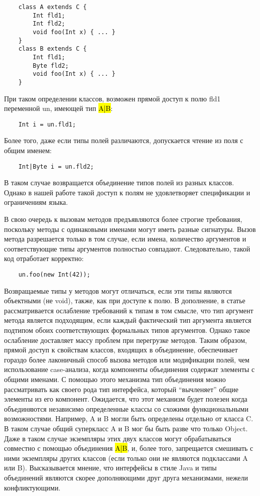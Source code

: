 \begin{lstlisting}
    class A extends C {
        Int fld1;
        Int fld2;
        void foo(Int x) { ... }
    }
    class B extends C {
        Int fld1;
        Byte fld2;
        void foo(Int x) { ... }
    }
\end{lstlisting}

При таком определении классов, возможен прямой доступ к полю fld1 переменной un, имеющей тип \hl{A|B}:

\begin{lstlisting}
    Int i = un.fld1;
\end{lstlisting}

Более того, даже если типы полей различаются, допускается чтение из поля с общим именем:

\begin{lstlisting}
    Int|Byte i = un.fld2;
\end{lstlisting}

В таком случае возвращается объединение типов полей из разных классов.
Однако в нашей работе такой доступ к полям не удовлетворяет спецификации и ограничениям языка.

В свою очередь к вызовам методов предъявляются более строгие требования, поскольку методы с одинаковыми именами могут
иметь разные сигнатуры.
Вызов метода разрешается только в том случае, если имена, количество аргументов и соответствующие
типы аргументов полностью совпадают.
Следовательно, такой код отработает корректно:

\begin{lstlisting}
    un.foo(new Int(42));
\end{lstlisting}

Возвращаемые типы у методов могут отличаться, если эти типы являются объектными (не void), также, как при доступе к полю.
В дополнение, в статье рассматривается ослабление требований к типам в том смысле, что тип аргумент метода является подходящим,
если каждый фактический тип аргумента является подтипом обоих соответствующих формальных типов аргументов.
Однако такое ослабление доставляет массу проблем при перегрузке методов.
Таким образом, прямой доступ к свойствам классов, входящих в объединение, обеспечивает гораздо более лаконичный способ
вызова методов или модификации полей, чем использование case-анализа, когда компоненты объединения
содержат элементы с общими именами.
С помощью этого механизма тип объединения можно рассматривать как своего рода тип интерфейса, который “вычленяет” общие
элементы из его компонент.
Ожидается, что этот механизм будет полезен когда объединяются независимо определенные классы со схожими функциональными
возможностями.
Например, A и B могли быть определены отдельно от класса C.
В таком случае общий суперкласс A и B мог бы быть разве что только Object.
Даже в таком случае экземпляры этих двух классов могут обрабатываться совместно с помощью объединения \hl{A|B}, и, более того,
запрещается смешивать с ними экземпляры других классов (если только они не являются подклассами A или B).
Высказывается мнение, что интерфейсы в стиле Java и типы объединений являются скорее дополняющими друг друга
механизмами, нежели конфликтующими.

